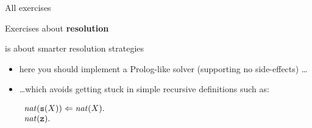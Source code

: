 \documentclass[presentation]{beamer}\mode<presentation>{\usetheme{AMSBolognaFC}}
\begin{document}
\begin{frame}[allowframebreaks]{All exercises}
\begin{block}{Exercises about \textbf{resolution}}
\begin{description}
            \startExercise
            \item[\currentExercise] is about smarter resolution strategies
            \begin{itemize}
                \item here you should implement a Prolog-like solver (supporting no side-effects) \ldots
                \item \ldots which avoids getting stuck in simple recursive definitions such as:
                \begin{center}
                    $\begin{array}{l}
                        \text{\textit{nat}}(\mathtt{s}(X)) \Leftarrow \text{\textit{nat}}(X) \mathtt{.}
                        \\
                        \text{\textit{nat}}(\mathtt{z}) \mathtt{.}
                    \end{array}$
                \end{center}
            \end{itemize} 
        \end{description}
    \end{block}
\end{frame}

\section*{}

\frame{\titlepage}

\section*{\refname}

\begin{frame}{\refname}
    \scriptsize
    
    
\end{frame}

\end{document}
